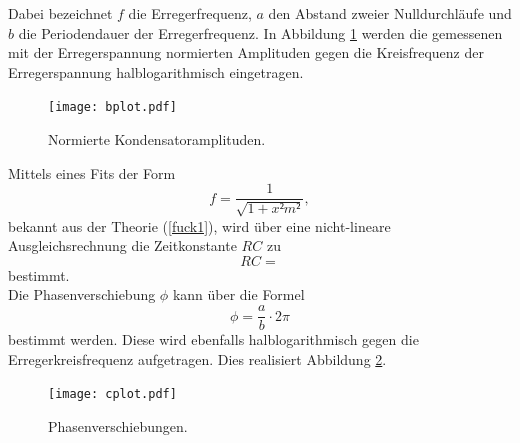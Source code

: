 %
%    
%
Dabei bezeichnet $f$ die Erregerfrequenz, $a$ den Abstand zweier Nulldurchläufe und $b$ die Periodendauer der Erregerfrequenz.
In Abbildung \ref{abb:3} werden die gemessenen mit der Erregerspannung normierten Amplituden gegen die Kreisfrequenz der Erregerspannung halblogarithmisch eingetragen.

\begin{figure}[H]
  \centering
  \texttt{[image: bplot.pdf]}
  \caption{Normierte Kondensatoramplituden.}
  \label{abb:3}
\end{figure}

Mittels eines Fits der Form
\begin{equation}
  f = \frac{1}{\sqrt{1+x²m²}},
\end{equation}
bekannt aus der Theorie (\ref{fuck1}), wird über eine nicht-lineare Ausgleichsrechnung die Zeitkonstante $RC$ zu
\begin{equation}
  RC = 
\end{equation}
bestimmt.\\
Die Phasenverschiebung $\phi$ kann über die Formel
\begin{equation}
  \phi = \frac{a}{b} \cdot 2\pi
\end{equation}
bestimmt werden.
Diese wird ebenfalls halblogarithmisch gegen die Erregerkreisfrequenz aufgetragen.
Dies realisiert Abbildung \ref{abb:4}.

\begin{figure}[H]
  \centering
  \texttt{[image: cplot.pdf]}
  \caption{Phasenverschiebungen.}
  \label{abb:4}
\end{figure}

